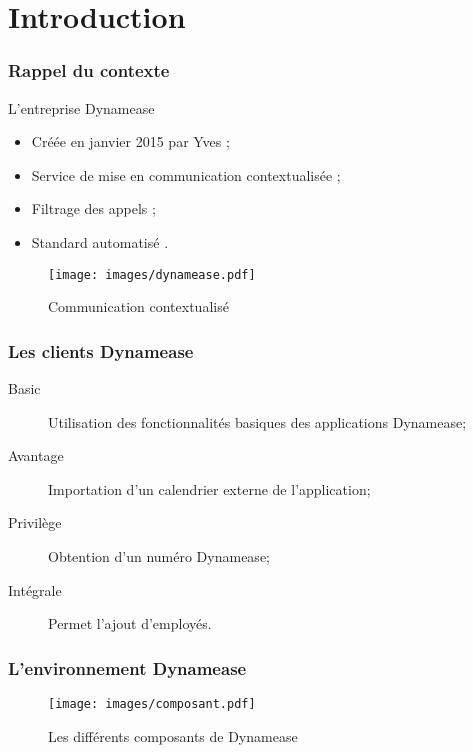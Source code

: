\section{Introduction}
\author{Kévin Moreau}


\begin{frame}
	\frametitle{Rappel du contexte}

	\begin{block}{L'entreprise Dynamease}
	 \begin{itemize}
      \item Créée en janvier 2015 par Yves  ;
	  \item Service de mise en communication contextualisée ;
	  \item Filtrage des appels ;
	  \item Standard automatisé .
	 \end{itemize}
	\end{block}

    \begin{center}
	  \begin{figure}
        \texttt{[image: images/dynamease.pdf]}
	   \caption{Communication contextualisé}
	  \end{figure}
	\end{center}
\end{frame}

\begin{frame}
	\frametitle{Les clients Dynamease}

    \begin{description}
    	\item[Basic] Utilisation des fonctionnalités basiques des applications Dynamease;
    	\item[Avantage] Importation d'un calendrier externe de l'application;
    	\item[Privilège] Obtention d'un numéro Dynamease;
    	\item[Intégrale] Permet l'ajout d'employés.
    \end{description}

\end{frame}

\begin{frame}
	\frametitle{L'environnement Dynamease}

    \begin{center}
	  \begin{figure}
        \texttt{[image: images/composant.pdf]}
	   \caption{Les différents composants de Dynamease}
	  \end{figure}
	\end{center}

\end{frame}

